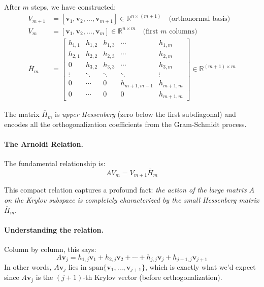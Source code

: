 After $m$ steps, we have constructed:
\begin{align}
V_{m+1} &= [\mathbf{v}_1, \mathbf{v}_2, \ldots, \mathbf{v}_{m+1}] \in \mathbb{R}^{n \times (m+1)} \quad \text{(orthonormal basis)} \\
V_m &= [\mathbf{v}_1, \mathbf{v}_2, \ldots, \mathbf{v}_m] \in \mathbb{R}^{n \times m} \quad \text{(first $m$ columns)} \\
\overline{H}_m &= \begin{bmatrix}
h_{1,1} & h_{1,2} & h_{1,3} & \cdots & h_{1,m} \\
h_{2,1} & h_{2,2} & h_{2,3} & \cdots & h_{2,m} \\
0 & h_{3,2} & h_{3,3} & \cdots & h_{3,m} \\
\vdots & \ddots & \ddots & \ddots & \vdots \\
0 & \cdots & 0 & h_{m+1,m-1} & h_{m+1,m} \\
0 & \cdots & 0 & 0 & h_{m+1,m}
\end{bmatrix} \in \mathbb{R}^{(m+1) \times m}
\end{align}

The matrix $\overline{H}_m$ is \emph{upper Hessenberg} (zero below the first subdiagonal) and encodes all the orthogonalization coefficients from the Gram-Schmidt process.

\paragraph{The Arnoldi Relation.}
The fundamental relationship is:
\begin{equation}\label{eq:arnoldi-relation}
\boxed{AV_m = V_{m+1}\overline{H}_m}
\end{equation}

This compact relation captures a profound fact: \emph{the action of the large matrix $A$ on the Krylov subspace is completely characterized by the small Hessenberg matrix $\overline{H}_m$}.

\paragraph{Understanding the relation.} Column by column, this says:
\[
A\mathbf{v}_j = h_{1,j}\mathbf{v}_1 + h_{2,j}\mathbf{v}_2 + \cdots + h_{j,j}\mathbf{v}_j + h_{j+1,j}\mathbf{v}_{j+1}
\]
In other words, $A\mathbf{v}_j$ lies in $\text{span}\{\mathbf{v}_1, \ldots, \mathbf{v}_{j+1}\}$, which is exactly what we'd expect since $A\mathbf{v}_j$ is the $(j+1)$-th Krylov vector (before orthogonalization).

